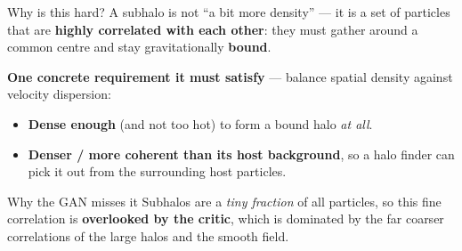 \documentclass[aspectratio=169]{beamer}
\begin{document}
\begin{frame}{Why is this hard?}
\small
A subhalo is not ``a bit more density'' --- it is a set of particles that are
\textbf{highly correlated with each other}: they must gather around a common
centre and stay gravitationally \textbf{bound}.

\vspace{0.15cm}
\textbf{One concrete requirement it must satisfy} --- balance spatial density
against velocity dispersion:
\begin{itemize}
    \item \textbf{Dense enough} (and not too hot) to form a bound halo \emph{at all}.
    \item \textbf{Denser / more coherent than its host background}, so a halo
          finder can pick it out from the surrounding host particles.
\end{itemize}

\vspace{0.2cm}
\centering
{}

\begin{block}{Why the GAN misses it}
Subhalos are a \emph{tiny fraction} of all particles, so this fine correlation
is \textbf{overlooked by the critic}, which is dominated by the far coarser
correlations of the large halos and the smooth field.
\end{block}
\end{frame}

\end{document}
